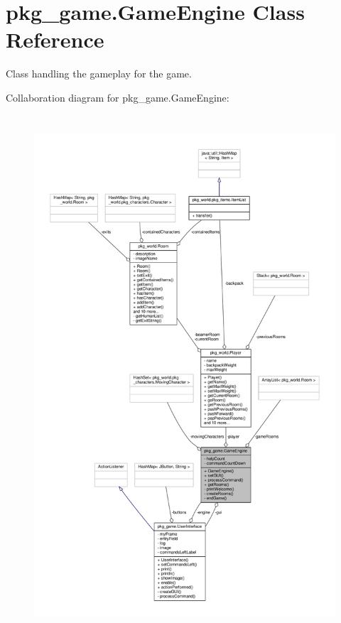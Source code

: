 \hypertarget{classpkg__game_1_1GameEngine}{\section{pkg\-\_\-game.\-Game\-Engine Class Reference}
\label{classpkg__game_1_1GameEngine}
}


Class handling the gameplay for the game.  




Collaboration diagram for pkg\-\_\-game.\-Game\-Engine\-:
\nopagebreak
\begin{figure}[H]
\begin{center}
\leavevmode
\includegraphics[height=550pt]{classpkg__game_1_1GameEngine__coll__graph}
\end{center}
\end{figure}
